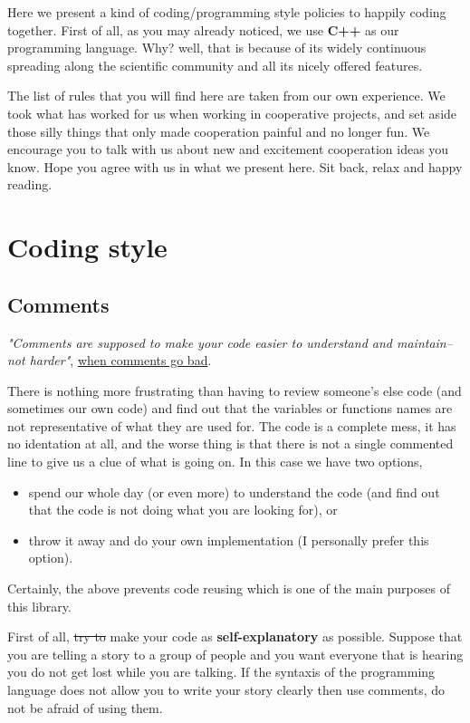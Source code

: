 \documentclass[11pt]{article}
\author{Julio}
\date{\today}
\title{}
\begin{document}
\tableofcontents

Here we present a kind of coding/programming style policies to happily
coding together. First of all, as you may already noticed, we use
\textbf{C++} as our programming language. Why? well, that is because of its
widely continuous spreading along the scientific community and all its
nicely offered features.

The list of rules that you will find here are taken from our own
experience. We took what has worked for us when working in cooperative
projects, and set aside those silly things that only made cooperation
painful and no longer fun. We encourage you to talk with us about new
and excitement cooperation ideas you know. Hope you agree with us in
what we present here. Sit back, relax and happy reading.

\section{Coding style}
\label{sec:org15c0b73}

\subsection{Comments}
\label{sec:org742c172}

\emph{"Comments are supposed to make your code easier to understand and
maintain-- not harder"}, \href{http://blog.codinghorror.com/when-good-comments-go-bad}{when comments go bad}.

There is nothing more frustrating than having to review someone's else
code (and sometimes our own code) and find out that the variables or
functions names are not representative of what they are used for. The
code is a complete mess, it has no identation at all, and the worse
thing is that there is not a single commented line to give us a clue
of what is going on. In this case we have two options,
\begin{itemize}
\item spend our whole day (or even more) to understand the code (and find
out that the code is not doing what you are looking for), or
\item throw it away and do your own implementation (I personally prefer
this option).
\end{itemize}

Certainly, the above prevents code reusing which is one of the main
purposes of this library.

First of all, \sout{try to} make your code as \textbf{self-explanatory} as
possible. Suppose that you are telling a story to a group of people
and you want everyone that is hearing you do not get lost while you
are talking. If the syntaxis of the programming language does not
allow you to write your story clearly then use comments, do not be
afraid of using them.
\end{document}
